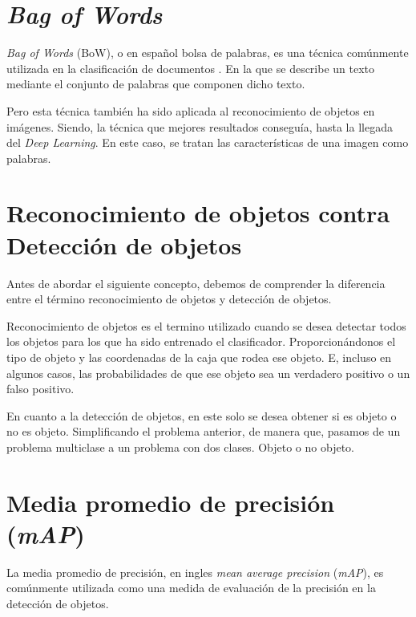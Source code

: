 \section{\textit{Bag of Words}}

\textit{Bag of Words} (BoW), o en español bolsa de palabras, es una técnica comúnmente utilizada en la clasificación de documentos \cite{wiki:bowmodel}. En la que se describe un texto mediante el conjunto de palabras que componen dicho texto.

Pero esta técnica también ha sido aplicada al reconocimiento de objetos en imágenes. Siendo, la técnica que mejores resultados conseguía, hasta la llegada del \textit{Deep Learning}. En este caso, se tratan las características de una imagen como palabras. 

\section{Reconocimiento de objetos contra Detección de objetos}

Antes de abordar el siguiente concepto, debemos de comprender la diferencia entre el término reconocimiento de objetos y detección de objetos.

Reconocimiento de objetos es el termino utilizado cuando se desea detectar todos los objetos para los que ha sido entrenado el clasificador. Proporcionándonos el tipo de objeto y las coordenadas de la caja que rodea ese objeto. E, incluso en algunos casos, las probabilidades de que ese objeto sea un verdadero positivo o un falso positivo.

En cuanto a la detección de objetos, en este solo se desea obtener si es objeto o no es objeto. Simplificando el problema anterior, de manera que, pasamos de un problema multiclase a un problema con dos clases. Objeto o no objeto.

\section{Media promedio de precisión (\textit{mAP})}

La media promedio de precisión, en ingles \textit{mean average precision} (\textit{mAP}), es comúnmente utilizada como una medida de evaluación de la precisión en la detección de objetos. %


